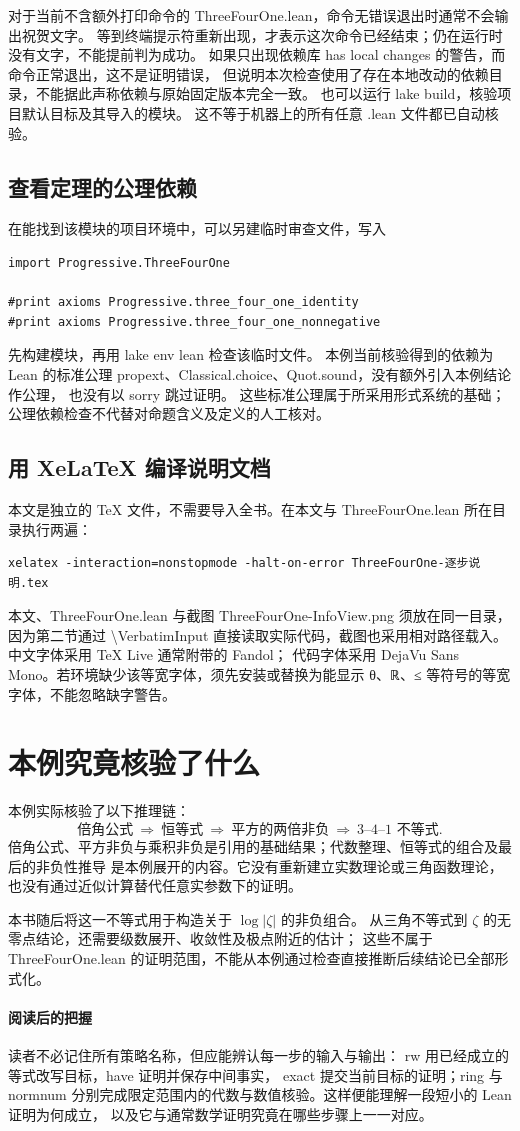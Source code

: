 \documentclass[UTF8,fontset=fandol,a4paper,11pt]{ctexart}
\newcommand{\code}[1]{{\small\ttfamily\def\_{\textunderscore\allowbreak}#1}}
\newcommand{\step}[1]{\Needspace{7\baselineskip}\subsection{#1}}
\begin{document}
对于当前不含额外打印命令的 \code{ThreeFourOne.lean}，命令无错误退出时通常不会输出祝贺文字。
等到终端提示符重新出现，才表示这次命令已经结束；仍在运行时没有文字，不能提前判为成功。
如果只出现依赖库 \code{has local changes} 的警告，而命令正常退出，这不是证明错误，
但说明本次检查使用了存在本地改动的依赖目录，不能据此声称依赖与原始固定版本完全一致。
也可以运行 \code{lake build}，核验项目默认目标及其导入的模块。
这不等于机器上的所有任意 \code{.lean} 文件都已自动核验。

\step{查看定理的公理依赖}
在能找到该模块的项目环境中，可以另建临时审查文件，写入
\begin{Verbatim}
import Progressive.ThreeFourOne

#print axioms Progressive.three_four_one_identity
#print axioms Progressive.three_four_one_nonnegative
\end{Verbatim}
先构建模块，再用 \code{lake env lean} 检查该临时文件。
本例当前核验得到的依赖为 Lean 的标准公理
\code{propext}、\code{Classical.choice}、\code{Quot.sound}，没有额外引入本例结论作公理，
也没有以 \code{sorry} 跳过证明。
这些标准公理属于所采用形式系统的基础；公理依赖检查不代替对命题含义及定义的人工核对。

\step{用 XeLaTeX 编译说明文档}
本文是独立的 TeX 文件，不需要导入全书。在本文与 \code{ThreeFourOne.lean} 所在目录执行两遍：
\begin{Verbatim}
xelatex -interaction=nonstopmode -halt-on-error ThreeFourOne-逐步说明.tex
\end{Verbatim}
本文、\code{ThreeFourOne.lean} 与截图 \code{ThreeFourOne-InfoView.png}
须放在同一目录，因为第二节通过 \code{\textbackslash VerbatimInput}
直接读取实际代码，截图也采用相对路径载入。中文字体采用 TeX Live 通常附带的 Fandol；
代码字体采用 DejaVu Sans Mono。若环境缺少该等宽字体，须先安装或替换为能显示
\code{θ}、\code{ℝ}、\code{≤} 等符号的等宽字体，不能忽略缺字警告。

\section{本例究竟核验了什么}

本例实际核验了以下推理链：
\[
  \text{倍角公式}
  \ \Longrightarrow\ 
  \text{恒等式}
  \ \Longrightarrow\ 
  \text{平方的两倍非负}
  \ \Longrightarrow\ 
  \text{3--4--1 不等式}.
\]
倍角公式、平方非负与乘积非负是引用的基础结果；代数整理、恒等式的组合及最后的非负性推导
是本例展开的内容。它没有重新建立实数理论或三角函数理论，也没有通过近似计算替代任意实参数下的证明。

本书随后将这一不等式用于构造关于 $\log|\zeta|$ 的非负组合。
从三角不等式到 $\zeta$ 的无零点结论，还需要级数展开、收敛性及极点附近的估计；
这些不属于 \code{ThreeFourOne.lean} 的证明范围，不能从本例通过检查直接推断后续结论已全部形式化。

\paragraph{阅读后的把握}
读者不必记住所有策略名称，但应能辨认每一步的输入与输出：
\code{rw} 用已经成立的等式改写目标，\code{have} 证明并保存中间事实，
\code{exact} 提交当前目标的证明；\code{ring} 与 \code{norm\_num}
分别完成限定范围内的代数与数值核验。这样便能理解一段短小的 Lean 证明为何成立，
以及它与通常数学证明究竟在哪些步骤上一一对应。
\end{document}
